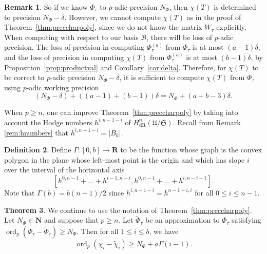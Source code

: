\documentclass[a4paper,11pt]{article}
\numberwithin{equation}{section}
\providecommand{\card}[1]{\lvert#1\rvert}                %
\newcommand{\NN}{\mathbf{N}} %
\newcommand{\RR}{\mathbf{R}} %
\DeclareMathOperator{\ord}{ord}          %
\providecommand{\HdR}{H_{\text{dR}}}    %
\providecommand{\cB}{\mathcal{B}} %
\theoremstyle{definition}
\newtheorem{thm}{Theorem}[section]
\newtheorem{defn}[thm]{Definition}
\newtheorem{rem}[thm]{Remark}
\begin{document}
\begin{rem} \label{rem:workprecchi}
So if we know $\Phi_{\tau}$ to $p$-adic precision $N_{\Phi}$, then
$\chi(T)$ is determined to precision $N_{\Phi}-\delta$.
However, we cannot compute $\chi(T)$ as in the proof of 
Theorem~\ref{thm:preccharpoly}, since we do not know the matrix 
$W_{\tau}$ explicitly. When computing with respect to our basis $\cB$,
there will be loss of $p$-adic precision. The loss of precision 
in computing $\Phi_{\tau}^{(a)}$ from $\Phi_{\tau}$ is at most 
$(a-1)\delta$, and the loss of 
precision in computing $\chi(T)$ from $\Phi_{\tau}^{(a)}$ 
is at most $(b-1) \delta$, by Proposition~\ref{prop:productval} and 
Corollary~\ref{cor:delta}. Therefore, for $\chi(T)$ to be correct
to $p$-adic precision $N_{\Phi}-\delta$, it is sufficient to compute 
$\chi(T)$ from $\Phi_{\tau}$ using $p$-adic working precision 
\[
(N_{\Phi}-\delta)+((a-1)+(b-1))\delta=N_{\Phi}+(a+b-3)\delta.
\] 
\end{rem}

When $p \geq n$, one can improve Theorem~\ref{thm:preccharpoly} by taking into 
account the Hodge numbers $h^{i,n-1-i}$ of $\HdR^{n}(\mathfrak{U}/\mathfrak{S})$.
Recall from Remark \ref{rem:hnumbers} that $h^{i,n-1-i}=\card{B_k}$.

\begin{defn}
Define $\Gamma: [0,b] \rightarrow \RR$ to be the function whose graph is the convex 
polygon in the plane whose left-most point is the origin and which has slope $i$ over
the interval of the horizontal axis 
\[
[h^{0,n-1}+\dotsc+h^{i-1,n-i},h^{0,n-1}+\dotsc+h^{i,n-i+1}].
\]
Note that $\Gamma(b)=b(n-1)/2$ since $h^{i,n-1-i}=h^{n-1-i,i}$ for all $0 \leq i \leq n-1$.
\end{defn}

\begin{thm} \label{thm:pgeqn}
We continue to use the notation of Theorem~\ref{thm:preccharpoly}. 
Let $N_{\Phi} \in \NN$ and suppose that $p \geq n$. Let $\tilde{\Phi}_{\tau}$ 
be an approximation to $\Phi_{\tau}$ satisfying $\ord_p (\Phi_{\tau}-\tilde{\Phi}_{\tau}) \geq N_{\Phi}$. 
Then for all $1 \leq i \leq b$, we have
\[
\ord_p(\chi_i-\tilde{\chi}_i) \geq N_{\Phi} + a\Gamma(i-1).
\]
\end{thm}
 
\end{document}
